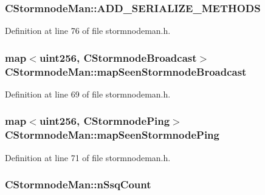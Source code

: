 \subsubsection[{A\+D\+D\+\_\+\+S\+E\+R\+I\+A\+L\+I\+Z\+E\+\_\+\+M\+E\+T\+H\+O\+D\+S}]{\setlength{\rightskip}{0pt plus 5cm}C\+Stormnode\+Man\+::\+A\+D\+D\+\_\+\+S\+E\+R\+I\+A\+L\+I\+Z\+E\+\_\+\+M\+E\+T\+H\+O\+D\+S}\label{class_c_stormnode_man_a3a52c5c9b8e3d7da4cb5c649cb9a6ca3}


Definition at line 76 of file stormnodeman.\+h.

\hypertarget{class_c_stormnode_man_a320b85dcbbc8f01a412c96b23bca5424}{}
\subsubsection[{map\+Seen\+Stormnode\+Broadcast}]{\setlength{\rightskip}{0pt plus 5cm}map$<${\bf uint256}, {\bf C\+Stormnode\+Broadcast}$>$ C\+Stormnode\+Man\+::map\+Seen\+Stormnode\+Broadcast}\label{class_c_stormnode_man_a320b85dcbbc8f01a412c96b23bca5424}


Definition at line 69 of file stormnodeman.\+h.

\hypertarget{class_c_stormnode_man_a9d4e8bbd492630f16b61eec58b722a86}{}
\subsubsection[{map\+Seen\+Stormnode\+Ping}]{\setlength{\rightskip}{0pt plus 5cm}map$<${\bf uint256}, {\bf C\+Stormnode\+Ping}$>$ C\+Stormnode\+Man\+::map\+Seen\+Stormnode\+Ping}\label{class_c_stormnode_man_a9d4e8bbd492630f16b61eec58b722a86}


Definition at line 71 of file stormnodeman.\+h.

\hypertarget{class_c_stormnode_man_a28c2a3dcb6098e416de7b1758b8d48da}{}
\subsubsection[{n\+Ssq\+Count}]{ C\+Stormnode\+Man\+::n\+Ssq\+Count}\label{class_c_stormnode_man_a28c2a3dcb6098e416de7b1758b8d48da}


